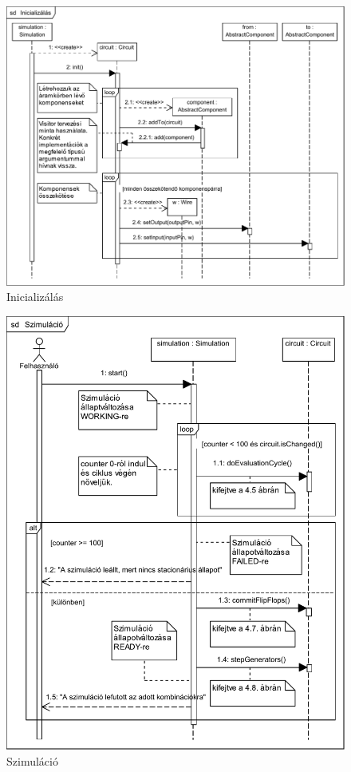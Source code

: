 \begin{figure}[H]
\begin{center}
\includegraphics[angle=90]{chapters/chapter04/seqdiagrams/new/init.pdf}
\caption{Inicializálás}
\label{fig:init}
\end{center}
\end{figure}

\begin{figure}[H]
\begin{center}
\includegraphics{chapters/chapter04/seqdiagrams/new/simulation.pdf}
\caption{Szimuláció}
\label{fig:simulation}
\end{center}
\end{figure}

